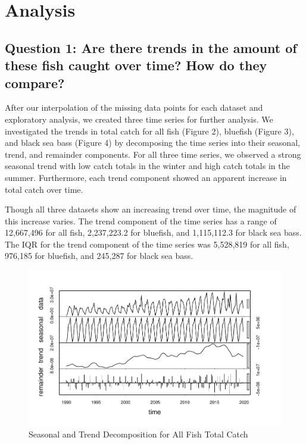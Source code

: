 \documentclass[
  12pt,
]{article}
\begin{document}
\newpage

\hypertarget{analysis}{%
\section{Analysis}\label{analysis}}

\hypertarget{question-1-are-there-trends-in-the-amount-of-these-fish-caught-over-time-how-do-they-compare}{%
\subsection{Question 1: Are there trends in the amount of these fish
caught over time? How do they
compare?}\label{question-1-are-there-trends-in-the-amount-of-these-fish-caught-over-time-how-do-they-compare}}

After our interpolation of the missing data points for each dataset and
exploratory analysis, we created three time series for further analysis.
We investigated the trends in total catch for all fish (Figure 2),
bluefish (Figure 3), and black sea bass (Figure 4) by decomposing the
time series into their seasonal, trend, and remainder components. For
all three time series, we observed a strong seasonal trend with low
catch totals in the winter and high catch totals in the summer.
Furthermore, each trend component showed an apparent increase in total
catch over time.

Though all three datasets show an increasing trend over time, the
magnitude of this increase varies. The trend component of the time
series has a range of 12,667,496 for all fish, 2,237,223.2 for bluefish,
and 1,115,112.3 for black sea bass. The IQR for the trend component of
the time series was 5,528,819 for all fish, 976,185 for bluefish, and
245,287 for black sea bass.

\begin{figure}[H]

\hfill{}\includegraphics{Report_FishTrends_files/figure-latex/All Fish Trends-1} 

\caption{Seasonal and Trend Decomposition for All Fish Total Catch}\label{fig:All Fish Trends}
\end{figure}
\end{document}
